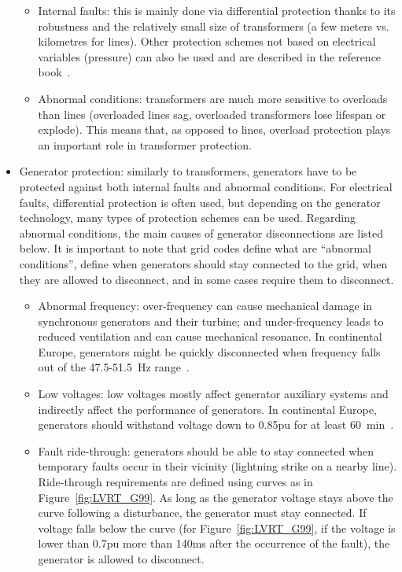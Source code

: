 \begin{itemize}
    \begin{itemize}
        \item Internal faults: this is mainly done via differential protection thanks to its robustness and the relatively small size of transformers (a few meters vs. kilometres for lines). Other protection schemes not based on electrical variables (\eg pressure) can also be used and are described in the reference book~\cite{HorowitzBook}.
        \item Abnormal conditions: transformers are much more sensitive to overloads than lines (overloaded lines sag, overloaded transformers lose lifespan or explode). This means that, as opposed to lines, overload protection plays an important role in transformer protection.
    \end{itemize}
    \item Generator protection: similarly to transformers, generators have to be protected against both internal faults and abnormal conditions. For electrical faults, differential protection is often used, but depending on the generator technology, many types of protection schemes can be used. Regarding abnormal conditions, the main causes of generator disconnections are listed below. It is important to note that grid codes define what are ``abnormal conditions'', \ie define when generators should stay connected to the grid, when they are allowed to disconnect, and in some cases require them to disconnect.
    \begin{itemize}
        \item Abnormal frequency: over-frequency can cause mechanical damage in synchronous generators and their turbine; and under-frequency leads to reduced ventilation and can cause mechanical resonance. In continental Europe, generators might be quickly disconnected when frequency falls out of the 47.5-51.5~Hz range~\cite{ENTSOEgeneratorRequirements}.
        \item Low voltages: low voltages mostly affect generator auxiliary systems and indirectly affect the performance of generators. In continental Europe, generators should withstand voltage down to 0.85pu for at least 60~min~\cite{ENTSOEgeneratorRequirements}.
        \item Fault ride-through: generators should be able to stay connected when temporary faults occur in their vicinity (\eg lightning strike on a nearby line). Ride-through requirements are defined using curves as in Figure~\ref{fig:LVRT_G99}. As long as the generator voltage stays above the curve following a disturbance, the generator must stay connected. If voltage falls below the curve (\eg for Figure~\ref{fig:LVRT_G99}, if the voltage is lower than 0.7pu more than 140ms after the occurrence of the fault), the generator is allowed to disconnect.

\end{itemize}
\end{itemize}

